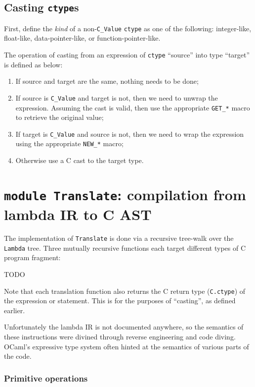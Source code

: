 \documentclass[12pt,a4paper,twoside,openright]{report}
\begin{document}
\subsection{Casting \texttt{ctype}s}

First, define the \textit{kind} of a non-\lstinline!C_Value! \lstinline!ctype!
as one of the following: integer-like, float-like, data-pointer-like, or
function-pointer-like.

The operation of casting from an expression of \lstinline!ctype! ``source''
into type ``target'' is defined as below:

\begin{enumerate}
  \item If source and target are the same, nothing needs to be done;
  \item If source is \lstinline!C_Value! and target is not, then we need to
    unwrap the expression. Assuming the cast is valid, then use the appropriate
    \lstinline!GET_*! macro to retrieve the original value;
  \item If target is \lstinline!C_Value! and source is not, then we need to
    wrap the expression using the appropriate \lstinline!NEW_*! macro;
  \item Otherwise use a C cast to the target type.
\end{enumerate}

\section{\texttt{module Translate}: compilation from lambda IR to C AST}

The implementation of \lstinline!Translate! is done via a recursive tree-walk
over the \lstinline!Lambda! tree. Three mutually recursive functions each
target different types of C program fragment:

TODO

Note that each translation function also returns the C return type
(\lstinline!C.ctype!) of the expression or statement. This is for the purposes of ``casting'', as defined earlier.

Unfortunately the lambda IR is not documented anywhere, so the semantics
of these instructions were divined through reverse engineering and code diving.
OCaml's expressive type system often hinted at the semantics of various
parts of the code.

\subsubsection{Primitive operations}
\end{document}
